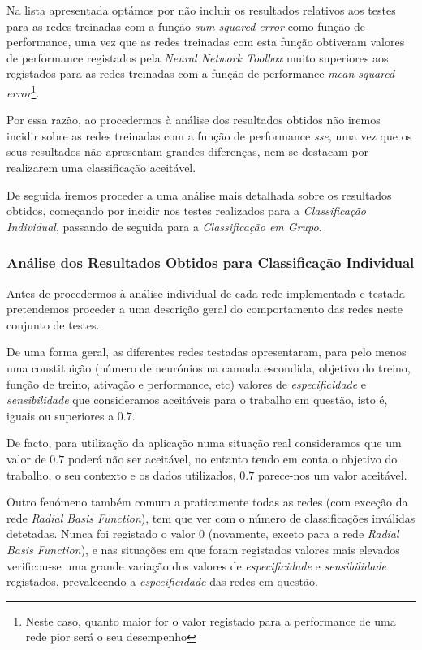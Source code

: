 \documentclass{article}
\begin{document}
Na lista apresentada optámos por não incluir os resultados relativos aos testes para as redes treinadas com a função \emph{sum squared error} como função de performance, uma vez que as redes treinadas com esta função obtiveram valores de performance registados pela \emph{Neural Network Toolbox} muito superiores aos registados para as redes treinadas com a função de performance \emph{mean squared error}\footnote{Neste caso, quanto maior for o valor registado para a performance de uma rede pior será o seu desempenho}.

Por essa razão, ao procedermos à análise dos resultados obtidos não iremos incidir sobre as redes treinadas com a função de performance \emph{sse}, uma vez que os seus resultados não apresentam grandes diferenças, nem se destacam por realizarem uma classificação aceitável.

De seguida iremos proceder a uma análise mais detalhada sobre os resultados obtidos, começando por incidir nos testes realizados para a \emph{Classificação Individual}, passando de seguida para a \emph{Classificação em Grupo}.

\subsubsection{Análise dos Resultados Obtidos para Classificação Individual}

Antes de procedermos à análise individual de cada rede implementada e testada pretendemos proceder a uma descrição geral do comportamento das redes neste conjunto de testes.

De uma forma geral, as diferentes redes testadas apresentaram, para pelo menos uma constituição (número de neurónios na camada escondida, objetivo do treino, função de treino, ativação e performance, etc) valores de \emph{especificidade} e \emph{sensibilidade} que consideramos aceitáveis para o trabalho em questão, isto é, iguais ou superiores a $0.7$.

De facto, para utilização da aplicação numa situação real consideramos que um valor de $0.7$ poderá não ser aceitável, no entanto tendo em conta o objetivo do trabalho, o seu contexto e os dados utilizados, $0.7$ parece-nos um valor aceitável.

Outro fenómeno também comum a praticamente todas as redes (com exceção da rede \emph{Radial Basis Function}), tem que ver com o número de classificações inválidas detetadas. Nunca foi registado o valor 0 (novamente, exceto para a rede \emph{Radial Basis Function}), e nas situações em que foram registados valores mais elevados verificou-se uma grande variação dos valores de \emph{especificidade} e \emph{sensibilidade} registados, prevalecendo a \emph{especificidade} das redes em questão.
\end{document}

